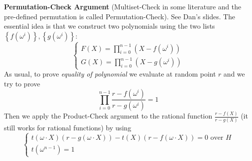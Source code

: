\documentclass{article}
\begin{document}
\textbf{Permutation-Check Argument} (Multiset-Check in some literature and the pre-defined permutation is called Permutation-Check). See Dan's slides. The essential idea is that we construct two polynomials using the two lists $\left\{ f(\omega^i) \right\}, \left\{ g(\omega^i) \right\}$:
\begin{equation*}
\begin{cases}
F(X) = \prod_{i = 0}^{n-1} (X - f(\omega^i)) \\
G(X) = \prod_{i = 0}^{n-1} (X - g(\omega^i))
\end{cases}
\end{equation*}
As usual, to prove \textit{equality of polynomial} we evaluate at random point $r$ and we try to prove
\begin{equation*}
\prod_{i = 0}^{n-1} \frac{r - f(\omega^i)}{r - g(\omega^i)} = 1
\end{equation*}
Then we apply the Product-Check argument to the rational function $\frac{r - f(X)}{r - g(X)}$ (it still works for rational functions) by using
\begin{equation*}
\begin{cases}
t(\omega \cdot X) (r - g(\omega \cdot X)) - t(X) (r - f(\omega \cdot X)) = 0 \text{ over } H\\
t(\omega^{n-1}) = 1
\end{cases}
\end{equation*}
\end{document}
